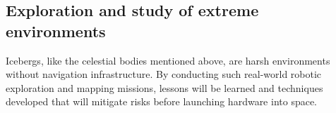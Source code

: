 %
%



\subsection{Exploration and study of extreme environments}

Icebergs, like the celestial bodies mentioned above, are harsh environments without navigation infrastructure. By conducting such real-world robotic exploration and mapping missions, lessons will be learned and techniques developed that will mitigate risks before launching hardware into space. 

